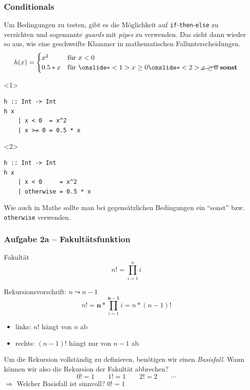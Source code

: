 \documentclass{beamer}
\begin{document}
	\begin{frame}[fragile] \frametitle{Conditionals}
		\footnotesize
		Um Bedingungen zu testen, gibt es die Möglichkeit auf \texttt{if}-\texttt{then}-\texttt{else} zu verzichten und sogenannte \textit{guards} mit \textit{pipes} zu verwenden. Das sieht dann wieder so aus, wie eine geschweifte Klammer in mathematischen Fallunterscheidungen. 
		\begin{equation*}
			h(x) = \begin{cases}
				x^2 & \text{für } x < 0 \\
				0.5*x & \text{für } \onslide*<1>{x \ge 0} \onslide*<2>{\cancel{x \ge 0} \text{ \textbf{sonst}}}
			\end{cases} 
		\end{equation*}
		\begin{onlyenv}<1>
			\begin{lstlisting}[style=bg]
h :: Int -> Int
h x 
	| x < 0  = x^2 
	| x >= 0 = 0.5 * x
			\end{lstlisting}
		\end{onlyenv}
		\begin{onlyenv}<2>
			\begin{lstlisting}[style=bg]
h :: Int -> Int
h x 
	| x < 0     = x^2 
	| otherwise = 0.5 * x
			\end{lstlisting}
		\end{onlyenv}
		\pause
		Wie auch in Mathe sollte man bei gegensätzlichen Bedingungen ein \enquote{sonst} bzw. \texttt{otherwise} verwenden.
	\end{frame}


	\begin{frame}\frametitle{Aufgabe 2a -- Fakultätsfunktion}
		\footnotesize
		Fakultät
		\begin{equation*}
			n! = \prod_{i=1}^n i
		\end{equation*}
		
		\medskip
		\pause
		
		Rekursionsvorschrift: $n \leadsto n-1$ \pause
		\begin{equation*}
			n! = \boldsymbol{n} * \prod_{i=1}^{\boldsymbol{n-1}} i= n * (n-1)!
		\end{equation*}
		\begin{itemize}
			\item links: $n!$ hängt von $n$ ab
			\item rechts: $(n-1)!$ hängt nur von $n-1$ ab
		\end{itemize}
		
		\medskip
		\pause
		
		Um die Rekursion vollständig zu definieren, benötigen wir einen \textit{Basisfall}. Wann können wir also die Rekursion der Fakultät abbrechen?
		\begin{equation*}
			0 ! = 1 \qquad 1 ! = 1 \qquad 2! = 2 \qquad \cdots
		\end{equation*}
		$\Rightarrow$ Welcher Basisfall ist sinnvoll? \qquad $0! = 1$
	\end{frame}
\end{document}
